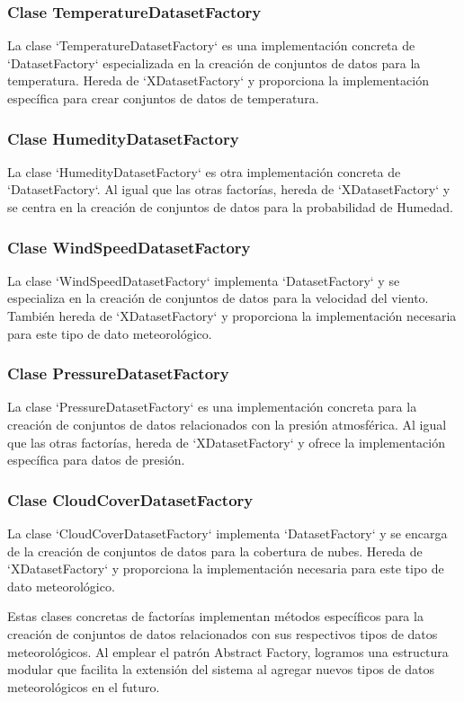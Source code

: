 \documentclass{article}
\begin{document}
\subsubsection{Clase TemperatureDatasetFactory}
La clase `TemperatureDatasetFactory` es una implementación concreta de `DatasetFactory` especializada en la creación de conjuntos de datos para la temperatura. Hereda de `XDatasetFactory` y proporciona la implementación específica para crear conjuntos de datos de temperatura.

\subsubsection{Clase HumedityDatasetFactory}
La clase `HumedityDatasetFactory` es otra implementación concreta de `DatasetFactory`. Al igual que las otras factorías, hereda de `XDatasetFactory` y se centra en la creación de conjuntos de datos para la probabilidad de Humedad.

\subsubsection{Clase WindSpeedDatasetFactory}
La clase `WindSpeedDatasetFactory` implementa `DatasetFactory` y se especializa en la creación de conjuntos de datos para la velocidad del viento. También hereda de `XDatasetFactory` y proporciona la implementación necesaria para este tipo de dato meteorológico.

\subsubsection{Clase PressureDatasetFactory}
La clase `PressureDatasetFactory` es una implementación concreta para la creación de conjuntos de datos relacionados con la presión atmosférica. Al igual que las otras factorías, hereda de `XDatasetFactory` y ofrece la implementación específica para datos de presión.

\subsubsection{Clase CloudCoverDatasetFactory}
La clase `CloudCoverDatasetFactory` implementa `DatasetFactory` y se encarga de la creación de conjuntos de datos para la cobertura de nubes. Hereda de `XDatasetFactory` y proporciona la implementación necesaria para este tipo de dato meteorológico.

Estas clases concretas de factorías implementan métodos específicos para la creación de conjuntos de datos relacionados con sus respectivos tipos de datos meteorológicos. Al emplear el patrón Abstract Factory, logramos una estructura modular que facilita la extensión del sistema al agregar nuevos tipos de datos meteorológicos en el futuro.
\end{document}

